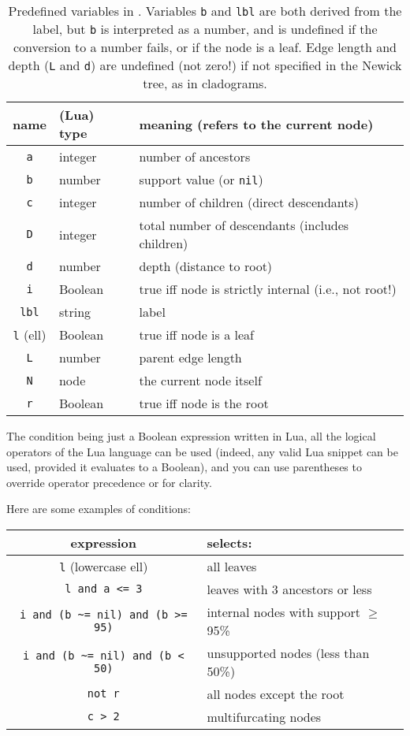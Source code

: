\begin{table}
	\centering
	\begin{tabular}{cll}
		name & (Lua) type & meaning (refers to the current node)\\
		\hline
		\texttt{a} & integer & number of ancestors  \\
		\texttt{b} & number & support value (or \texttt{nil}) \\
		\texttt{c} & integer & number of children (direct descendants) \\
		\texttt{D} & integer & total number of descendants (includes children) \\
		\texttt{d} & number & depth (distance to root) \\
		\texttt{i} & Boolean & true iff node is strictly internal (i.e., not root!) \\
		\texttt{lbl} & string & label \\
		\texttt{l} (ell) & Boolean & true iff node is a leaf \\
		\texttt{L} & number & parent edge length \\
		\texttt{N} & node & the current node itself \\
		\texttt{r} & Boolean & true iff node is the root
	\end{tabular}
	\caption{%
		\label{tbl:luaedPredefVar}
		Predefined variables in \luaed. Variables \texttt{b} and \texttt{lbl} are
		both derived from the label, but \texttt{b} is interpreted as a number, and
		is undefined if the conversion to a number fails, or if the node is a leaf.
		Edge length and depth (\texttt{L} and \texttt{d}) are undefined (not zero!)
		if not specified in the Newick tree, as in cladograms.
	}
\end{table}

The condition being just a Boolean expression written in Lua, all the logical
operators of the Lua language can be used (indeed, any valid Lua snippet can be
used, provided it evaluates to a Boolean), and you can use parentheses to
override operator precedence or for clarity.

\noindent{}Here are some examples of \luaed{} conditions:

\begin{center}
\begin{tabular}{cl}
expression & selects: \\
\hline
\texttt{l} (lowercase ell) & all leaves \\
\texttt{l and a <= 3} & leaves with 3 ancestors or less \\
\texttt{i and (b \~{ }= nil) and (b >= 95)} & internal nodes with support $\geq$ 95\% \\ 
\texttt{i and (b \~{ }= nil) and (b < 50)} & unsupported nodes (less than 50\%) \\
\texttt{not r} & all nodes except the root \\
\texttt{c > 2} & multifurcating nodes
\end{tabular}
\end{center}

